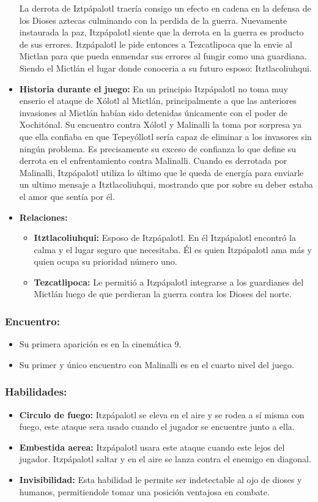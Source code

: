 \documentclass[11pt,letterpaper]{article}
\begin{document}
\begin{itemize}
	La derrota de Iztpápalotl traería consigo un efecto en cadena en la defensa de los Dioses aztecas culminando con la perdida de la guerra. Nuevamente instaurada la paz, Itzpápalotl siente que la derrota en la guerra es producto de sus errores. Itzpápalotl le pide entonces a Tezcatlipoca que la envie al Mictlan para que pueda enmendar sus errores al fungir como una guardiana. Siendo el Mictlán el lugar donde conoceria a su futuro esposo: Itztlacoliuhqui. 
	\item \textbf{Historia durante el juego:}
	En un principio Itzpápalotl no toma muy enserio el ataque de Xólotl al Mictlán, principalmente a que las anteriores invasiones al Mictlán habían sido detenidas únicamente con el poder de Xochitónal. Su encuentro contra Xólotl y Malinalli la toma por sorpresa ya que ella confiaba en que Tepeyóllotl sería capaz de eliminar a los invasores sin ningún problema. Es precisamente su exceso de confianza lo que define su  derrota en el enfrentamiento contra Malinalli. Cuando es derrotada por Malinalli, Itzpápalotl utiliza lo último que le queda de energía para enviarle un ultimo mensaje a Itztlacoliuhqui, mostrando que por sobre su deber estaba el amor que sentía por él.
	\item \textbf{Relaciones:}
	\begin{itemize}
		\item \textbf{Itztlacoliuhqui:} Esposo de Itzpápalotl. En él Itzpápalotl encontró la calma y el lugar seguro que necesitaba. Él es quien Itzpápalotl ama más y quien ocupa su prioridad número uno.  
		\item \textbf{Tezcatlipoca:} Le permitió a Itzpápalotl integrarse a los guardianes del Mictlán luego de que perdieran la guerra contra los Dioses del norte.   
	\end{itemize}                     
\end{itemize}

\subsubsection{Encuentro:}
\begin{itemize}
	\item Su primera aparición es en la cinemática 9. 
	\item Su primer y único encuentro con Malinalli es en el cuarto nivel del juego.
\end{itemize}
\subsubsection{Habilidades:}
\begin{itemize}
	\item \textbf{Circulo de fuego:} Itzpápalotl se eleva en el aire y se rodea a sí misma con fuego, este ataque sera usado cuando el jugador se encuentre junto a ella.
	\item \textbf{Embestida aerea:} Itzpápalotl usara este ataque cuando este lejos del jugador. Itzpápalotl saltar y en el aire se lanza contra el enemigo en diagonal.
	\item \textbf{Invisibilidad:} Esta habilidad le permite ser indetectable al ojo de dioses y humanos, permitiendole tomar una posición ventajosa en combate.
\end{itemize}
\end{document}
